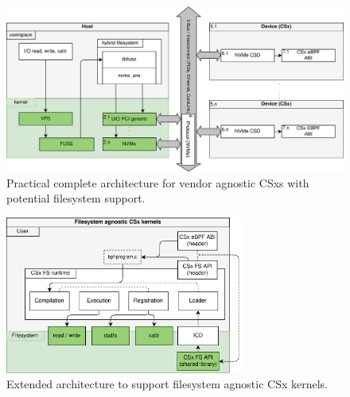 \begin{figure}
    \centering
	\includegraphics[width=1\textwidth]{resources/images/loader-pfs-arch-v3.png}
	\caption{Practical complete architecture for vendor agnostic CSxs with
        potential filesystem support.}
    \label{figure:practicalarchitecture}
\end{figure}



\begin{figure}
    \centering
	\includegraphics[width=0.7\textwidth]{resources/images/csx-fs-agnostic.png}
	\caption{Extended architecture to support filesystem agnostic CSx kernels.}
    \label{figure:csxfsruntime}
\end{figure}


